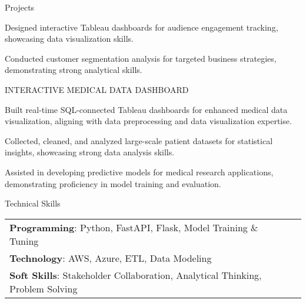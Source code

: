 \documentclass{resume} %
\begin{document}
\begin{rSection}{Projects}
\begin{rSubsection}
                                    \item Designed interactive Tableau dashboards for audience engagement tracking, showcasing data visualization skills.
                                    \item Conducted customer segmentation analysis for targeted business strategies, demonstrating strong analytical skills.
                            \end{rSubsection}
                    \begin{rSubsection}
                                    {INTERACTIVE MEDICAL DATA DASHBOARD}
                                {}{}{}
                                    \item Built real{-}time SQL{-}connected Tableau dashboards for enhanced medical data visualization, aligning with data preprocessing and data visualization expertise.
                                    \item Collected, cleaned, and analyzed large{-}scale patient datasets for statistical insights, showcasing strong data analysis skills.
                                    \item Assisted in developing predictive models for medical research applications, demonstrating proficiency in model training and evaluation.
                            \end{rSubsection}
            \end{rSection}

    \begin{rSection}{Technical Skills}
        \begin{tabular}{ @{} l @{	} l }
                                \textbf{Programming}: Python, FastAPI, Flask, Model Training \& Tuning\\
                                \textbf{Technology}: AWS, Azure, ETL, Data Modeling\\
                                \textbf{Soft Skills}: Stakeholder Collaboration, Analytical Thinking, Problem Solving\\
        \end{tabular}
    \end{rSection}
\end{document}
